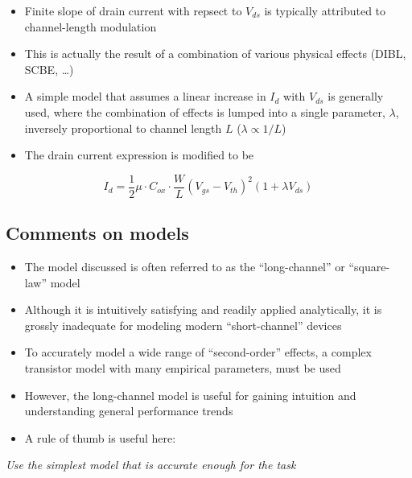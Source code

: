 \documentclass[11pt]{article}
\providecommand{\tightlist}{%
      \setlength{\itemsep}{0pt}\setlength{\parskip}{0pt}}
\begin{document}
    \begin{itemize}
\tightlist
\item
  Finite slope of drain current with repsect to \(V_{ds}\) is typically
  attributed to channel-length modulation
\item
  This is actually the result of a combination of various physical
  effects (DIBL, SCBE, \ldots)
\item
  A simple model that assumes a linear increase in \(I_d\) with
  \(V_{ds}\) is generally used, where the combination of effects is
  lumped into a single parameter, \(\lambda\), inversely proportional to
  channel length \(L\) (\(\lambda \propto 1/L\))
\item
  The drain current expression is modified to be
\end{itemize}

\begin{equation}
\boxed{I_d = \dfrac{1}{2}\mu\cdot C_{ox} \cdot \dfrac{W}{L}(V_{gs}-V_{th})^2 (1+\lambda V_{ds})}
\end{equation}

    \hypertarget{comments-on-models}{%
\subsection{Comments on models}\label{comments-on-models}}

    \begin{itemize}
\tightlist
\item
  The model discussed is often referred to as the ``long-channel'' or
  ``square-law'' model
\item
  Although it is intuitively satisfying and readily applied
  analytically, it is grossly inadequate for modeling modern
  ``short-channel'' devices
\item
  To accurately model a wide range of ``second-order'' effects, a
  complex transistor model with many empirical parameters, must be used
\item
  However, the long-channel model is useful for gaining intuition and
  understanding general performance trends
\item
  A rule of thumb is useful here:
\end{itemize}

\emph{Use the simplest model that is accurate enough for the task}


    
    
    
\end{document}
